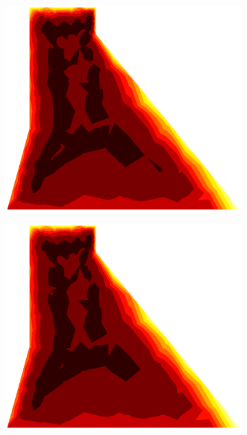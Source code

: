 \documentclass[10pt, a4paper]{article}
\begin{document}
\begin{figure}[H]
\begin{subfigure}[H]{0.19\textwidth}
		\includegraphics[width=1.2\textwidth]{fig/14.eps}
	\end{subfigure}
		\begin{subfigure}[H]{0.19\textwidth}
		\includegraphics[width=1.2\textwidth]{fig/15.eps}
	\end{subfigure}
	\begin{subfigure}[H]{0.19\textwidth}

\end{subfigure}
\end{figure}
\end{document}
